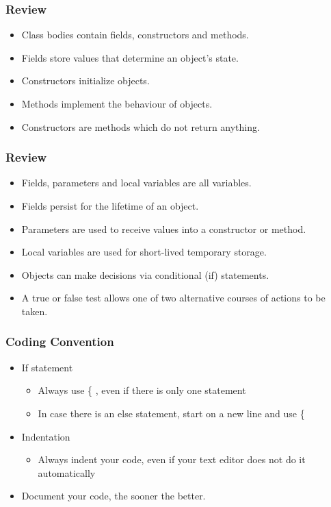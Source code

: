 \begin{frame}
\frametitle{Review}
\begin{itemize}
\item Class bodies contain fields, constructors and methods.
\item Fields store values that determine an object’s state.
\item Constructors initialize objects.
\item Methods implement the behaviour of objects.
\item Constructors are methods which do not return anything. 
\end{itemize}
\end{frame}

\begin{frame}
\frametitle{Review}
\begin{itemize}
\item Fields, parameters and local variables are all variables.
\item Fields persist for the lifetime of an object.
\item Parameters are used to receive values into a constructor or method.
\item Local variables are used for short-lived temporary storage. 
\item Objects can make decisions via conditional (if) statements.
\item A true or false test allows one of two alternative courses of actions to be taken.
\end{itemize}
\end{frame}

\begin{frame}
\frametitle{Coding Convention}
\begin{itemize}
\item If statement
\begin{itemize}
\item Always use \{ , even if there is only one statement
\item In case there is an else statement, start on a new line and use \{
\end{itemize}
\item Indentation
\begin{itemize}
\item Always indent your code, even if your text editor does not do it automatically
\end{itemize}
\item Document your code, the sooner the better. 
\end{itemize}
\end{frame}


